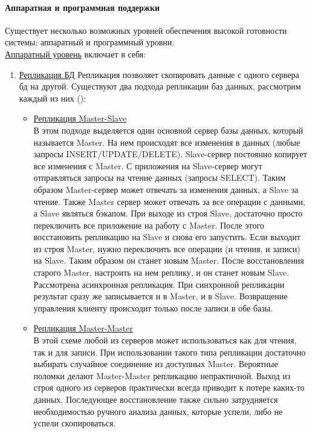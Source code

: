 \paragraph{Аппаратная и программная поддержки}
Существует несколько возможных уровней обеспечения высокой готовности системы: аппаратный и программный уровни. \\
\underline{Аппаратный уровень} включает в себя:
\begin{enumerate}
    \item \underline{Репликация БД}
    Репликация позволяет скопировать данные с одного сервера бд на другой.
    Существуют  два подхода репликации баз данных, рассмотрим каждый из них (\autocite{Gregorchenko}):
    \begin{itemize}
        \item \underline{Репликация Master-Slave} \\В этом подходе выделяется один основной сервер базы данных, который называется Master. На нем происходят все изменения в данных (любые запросы INSERT/UPDATE/DELETE). Slave-сервер постоянно копирует все изменения с Master. С приложения на Slave-сервер могут отправляться запросы на чтение данных (запросы SELECT). Таким образом Master-сервер может отвечать за изменения данных, а Slave за чтение. Также Master сервер может отвечать за все операции с данными, а Slave являться бэкапом. При выходе из строя Slave, достаточно просто переключить все приложение на работу с Master. После этого восстановить репликацию на Slave и снова его запустить. Если выходит из строя Master, нужно переключить все операции (и чтения, и записи) на Slave. Таким образом он станет новым Master. После восстановления старого Master, настроить на нем реплику, и он станет новым Slave. Рассмотрена асинхронная репликация. При синхронной репликации результат сразу же записывается и в Master, и в Slave. Возвращение управления клиенту происходит только после записи в обе базы.
        \item \underline{Репликация Master-Master}\\ В этой схеме любой из серверов может использоваться как для чтения, так и для записи. При использовании такого типа репликации достаточно выбирать случайное соединение из доступных Master. Вероятные поломки делают Master-Master репликацию непрактичной. Выход из строя одного из серверов практически всегда приводит к потере каких-то данных. Последующее восстановление также сильно затрудняется необходимостью ручного анализа данных, которые успели, либо не успели скопироваться.
    \end{itemize}  


\end{enumerate}
